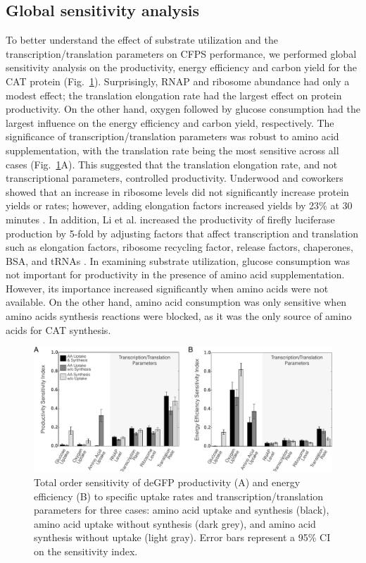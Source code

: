 \documentclass[journal=asbcd6,manuscript=article]{achemso}
\begin{document}
\subsection{Global sensitivity analysis}
To better understand the effect of substrate utilization and the transcription/translation parameters on CFPS performance, we performed global sensitivity analysis on the productivity, energy efficiency and carbon yield for the CAT protein (Fig.~\ref{fig:SI}).
Surprisingly, RNAP and ribosome abundance had only a modest effect;
the translation elongation rate had the largest effect on protein productivity.
On the other hand, oxygen followed by glucose consumption had the largest influence on the energy efficiency and carbon yield, respectively.
The significance of transcription/translation parameters was robust to amino acid supplementation, with the translation rate being the most sensitive across all cases (Fig.~\ref{fig:SI}A).
This suggested that the translation elongation rate, and not transcriptional parameters, controlled productivity.
Underwood and coworkers showed that an increase in ribosome levels did not significantly increase protein yields or rates; however, adding elongation factors increased yields by 23\% at 30 minutes \cite{2005_underwood_biotech}.
In addition, Li et al. increased the productivity of firefly luciferase production by 5-fold by adjusting factors that affect transcription and translation such as elongation factors, ribosome recycling factor, release factors, chaperones, BSA, and tRNAs \cite{2014_li_PlosOne}.
In examining substrate utilization, glucose consumption was not important for productivity in the presence of amino acid supplementation.
However, its importance increased significantly when amino acids were not available.
On the other hand, amino acid consumption was only sensitive when amino acids synthesis reactions were blocked, as it was the only source of amino acids for CAT synthesis.
\begin{figure}[t!]
\includegraphics[width=1.00\textwidth]{./figs/Fig-3-Sensitivity-Analysis.pdf}
\caption{Total order sensitivity of deGFP productivity (A) and energy efficiency (B) to specific uptake rates and transcription/translation parameters for three cases: amino acid uptake and synthesis (black), amino acid uptake without synthesis (dark grey), and amino acid synthesis without uptake (light gray). Error bars represent a 95\% CI on the sensitivity index.}
\label{fig:SI}
\end{figure}
\end{document}
